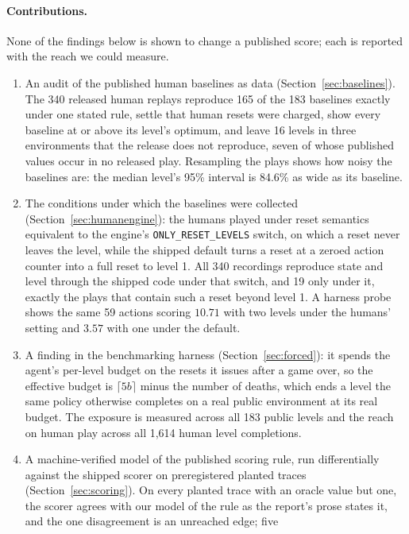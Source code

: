\documentclass[11pt]{article}
\newcommand{\code}[1]{\texttt{#1}}
\begin{document}
\paragraph{Contributions.} None of the findings below is shown to change a
published score; each is reported with the reach we could measure.
\begin{enumerate}
\item An audit of the published human baselines as data
      (Section~\ref{sec:baselines}). The 340 released human replays reproduce
      165 of the 183 baselines exactly under one stated rule, settle that
      human resets were charged, show every baseline at or above its level's
      optimum, and leave 16 levels in three environments that the release does
      not reproduce, seven of whose published values occur in no released play.
      Resampling the plays shows how noisy the baselines are: the median
      level's 95\% interval is 84.6\% as wide as its baseline.
\item The conditions under which the baselines were collected
      (Section~\ref{sec:humanengine}): the humans played under reset semantics
      equivalent to the engine's \code{ONLY\_RESET\_LEVELS} switch, on which a
      reset never leaves the level, while the shipped default turns a reset at
      a zeroed action counter into a full reset to level 1. All 340 recordings
      reproduce state and level through the shipped code under that switch,
      and 19 only under it, exactly the plays that contain such a reset beyond
      level 1. A harness probe shows the same 59 actions scoring $10.71$ with
      two levels under the humans' setting and $3.57$ with one under the
      default.
\item A finding in the benchmarking harness (Section~\ref{sec:forced}): it
      spends the agent's per-level budget on the resets it issues after a game
      over, so the effective budget is $\lceil 5b \rceil$ minus the number of
      deaths, which ends a level the same policy otherwise completes on a real
      public environment at its real budget. The exposure is measured across
      all 183 public levels and the reach on human play across all 1,614 human
      level completions.
\item A machine-verified model of the published scoring rule, run
      differentially against the shipped scorer on preregistered planted traces
      (Section~\ref{sec:scoring}). On every planted trace with an oracle value
      but one, the scorer agrees with our model of the rule as the report's
      prose states it, and the one disagreement is an unreached edge; five

\end{enumerate}
\end{document}
